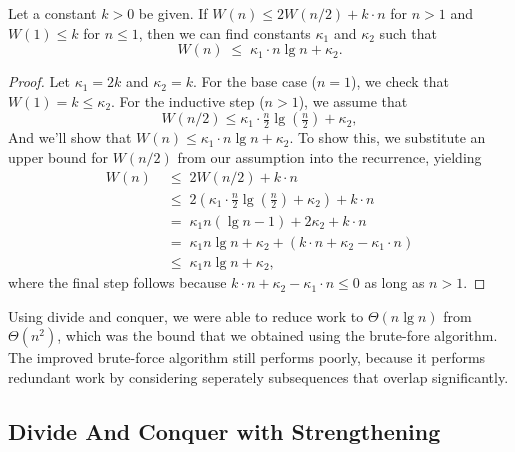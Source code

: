 \begin{flex}
\begin{theorem}
  Let a constant $k > 0$ be given.  If $W(n) \leq 2 W(n/2) + k \cdot n$ for $n >
  1$ and $W(1) \leq k$ for $n \leq 1$, then we can find constants $\kappa_1$ and
  $\kappa_2$ such that \[ W(n) \;\leq\; \kappa_1 \cdot n \lg n + \kappa_2.\]
\end{theorem}

\begin{proof}
  Let $\kappa_1 = 2k$ and $\kappa_2 = k$.  For the base case ($n=1$), we check
  that $W(1) = k \leq \kappa_2$.  For the inductive step ($n>1$), we assume that
  \[
  W(n/2) \leq \kappa_1 \cdot \tfrac{n}2 \lg (\tfrac{n}2) + \kappa_2,
  \]
  And we'll show that $W(n) \leq \kappa_1 \cdot n \lg n + \kappa_2$.  To show
  this, we substitute an upper bound for $W(n/2)$ from our assumption into the
  recurrence, yielding
  \begin{align*}
    W(n) \;&\leq\; 2W(n/2) + k \cdot n  \\
    \;&\leq\; 2(\kappa_1 \cdot \tfrac{n}2 \lg (\tfrac{n}2) + \kappa_2) + k \cdot n\\
    \;&=\; \kappa_1 n (\lg n - 1) + 2 \kappa_2 + k \cdot n\\
    \;&=\; \kappa_1 n \lg n + \kappa_2 + (k \cdot n + \kappa_2 - \kappa_1 \cdot n)\\
    \;&\leq\; \kappa_1 n \lg n + \kappa_2,
  \end{align*}
  where the final step follows because $k \cdot n + \kappa_2 - \kappa_1 \cdot n \leq
  0$ as long as $n > 1$.
\end{proof}
\end{flex}

\begin{teachnote}
Using divide and conquer, we were able to reduce work to
$\Theta(n\lg{n})$ from $\Theta(n^2)$, which was the bound that we
obtained using the brute-fore algorithm.
%
%
The improved brute-force algorithm still performs poorly, because it
performs  redundant work by considering seperately subsequences
that overlap significantly.  
%
\end{teachnote}


\subsection{Divide And Conquer with Strengthening}

